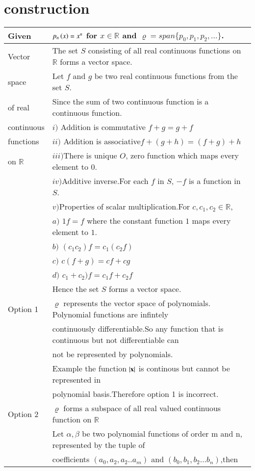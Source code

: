\documentclass[journal,12pt]{IEEEtran}
\begin{document}
\section{construction}
\renewcommand{\thetable}{1}
\begin{longtable}{|l|l|}
    \hline
    Given & $p_n\left(x\right)=x^n$ for $x\in\mathbb{R}$ and $\varrho=span\{p_0,p_1,p_2,...\}$.\\
    \hline
    Vector& The set $S$ consisting of all real continuous functions on $\mathbb{R}$ forms a vector space.\\
    space&Let $f$ and $g$ be two real continuous functions from the set $S$.\\
    of real&Since the sum of two continuous function is a continuous function.\\
    continuous&$i)$ Addition is commutative $f+g=g+f$\\
    functions&$ii)$ Addition is associative$f+(g+h)=(f+g)+h$\\
    on $\mathbb{R}$&$iii)$There is unique $O$, zero function which maps every element to 0.\\
    &$iv)$Additive inverse.For each $f$ in $S$, $-f$ is a function in $S$.\\
    &$v)$Properties of scalar multiplication.For $c,c_1,c_2\in \mathbb{R}$,\\
    &\qquad $a)$ $1f=f$ where the constant function $1$ maps every element to $1$.\\
    &\qquad $b)$ $(c_1c_2)f=c_1(c_2f)$\\
    &\qquad $c)$ $c(f+g)=cf+cg$\\
    &\qquad $d)$ $c_1+c_2)f=c_1f+c_2f$\\
    &Hence the set $S$ forms a vector space.\\
    \hline
    Option 1& $\varrho$ represents the vector space of polynomials. Polynomial functions are infintely \\
    & continuously differentiable.So any function that is continuous but not differentiable can \\
    & not be represented by polynomials.\\
    & Example the function $\mathbf{\left\vert x\right\vert}$ is continous but cannot be represented in \\
    &polynomial basis.Therefore option 1 is incorrect.\\
    \hline
    Option 2& $\varrho$ forms a subspace of all real valued continuous function on $\mathbb{R}$\\
    &Let $\alpha,\beta$ be two polynomial functions of order m and n, represented by the tuple of\\ &coefficients $(a_0,a_2,a_2..a_m)$ and $(b_0,b_1,b_2...b_n)$,then\\

\end{longtable}
\end{document}
